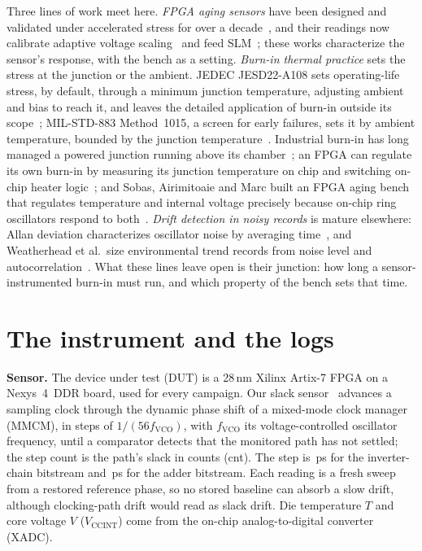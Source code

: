\documentclass[10pt,twocolumn]{article}
\begin{document}
Three lines of work meet here. \emph{FPGA aging sensors} have been designed and validated under accelerated stress for over a decade~\cite{valdes}, and their readings now calibrate adaptive voltage scaling~\cite{niemann} and feed SLM~\cite{kashyap}; these works characterize the sensor's response, with the bench as a setting. \emph{Burn-in thermal practice} sets the stress at the junction or the ambient. JEDEC JESD22-A108 sets operating-life stress, by default, through a minimum junction temperature, adjusting ambient and bias to reach it, and leaves the detailed application of burn-in outside its scope~\cite{jedec}; MIL-STD-883 Method~1015, a screen for early failures, sets it by ambient temperature, bounded by the junction temperature~\cite{mil}. Industrial burn-in has long managed a powered junction running above its chamber~\cite{vassighi}; an FPGA can regulate its own burn-in by measuring its junction temperature on chip and switching on-chip heater logic~\cite{xilinx}; and Sobas, Airimitoaie and Marc built an FPGA aging bench that regulates temperature and internal voltage precisely because on-chip ring oscillators respond to both~\cite{sobas}. \emph{Drift detection in noisy records} is mature elsewhere: Allan deviation characterizes oscillator noise by averaging time~\cite{allan}, and Weatherhead et al.\ size environmental trend records from noise level and autocorrelation~\cite{weatherhead}. What these lines leave open is their junction: how long a sensor-instrumented burn-in must run, and which property of the bench sets that time.

\section{The instrument and the logs}

\textbf{Sensor.} The device under test (DUT) is a 28\,nm Xilinx Artix-7 FPGA on a Nexys~4~DDR board, used for every campaign. Our slack sensor~\cite{sbcci25} advances a sampling clock through the dynamic phase shift of a mixed-mode clock manager (MMCM), in steps of $1/(56f_{\mathrm{VCO}})$, with $f_{\mathrm{VCO}}$ its voltage-controlled oscillator frequency, until a comparator detects that the monitored path has not settled; the step count is the path's slack in counts (cnt). The step is \vPsINV\,ps for the inverter-chain bitstream and \vPsRCA\,ps for the adder bitstream. Each reading is a fresh sweep from a restored reference phase, so no stored baseline can absorb a slow drift, although clocking-path drift would read as slack drift. Die temperature $T$ and core voltage $V$ ($V_{\mathrm{CCINT}}$) come from the on-chip analog-to-digital converter (XADC).
\end{document}
